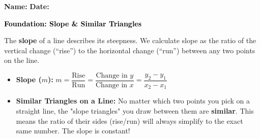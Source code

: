 \documentclass[12pt, letterpaper, fleqn]{article}
\begin{document}
\textbf{Name:} \underline{\hspace{5cm}}
\hfill
\textbf{Date:} \underline{\hspace{3cm}}\\

\begin{tcolorbox}[colback=customteal!20]
    \large\textcolor{black}{\textbf{Foundation: Slope \& Similar Triangles}}
\end{tcolorbox}

\vspace{3mm}

\noindent
The \textbf{slope} of a line describes its steepness. We calculate slope as the ratio of the vertical change (``rise'') to the horizontal change (``run'') between any two points on the line. 

\begin{itemize}
    \item \textbf{Slope ($m$):} $m = \dfrac{\text{Rise}}{\text{Run}} = \dfrac{\text{Change in } y}{\text{Change in } x} = \dfrac{y_2 - y_1}{x_2 - x_1}$
    \item \textbf{Similar Triangles on a Line:} No matter which two points you pick on a straight line, the "slope triangles" you draw between them are \textbf{similar}. This means the ratio of their sides (rise/run) will always simplify to the exact same number. The slope is constant!
\end{itemize}

\vspace{4mm}
\end{document}
